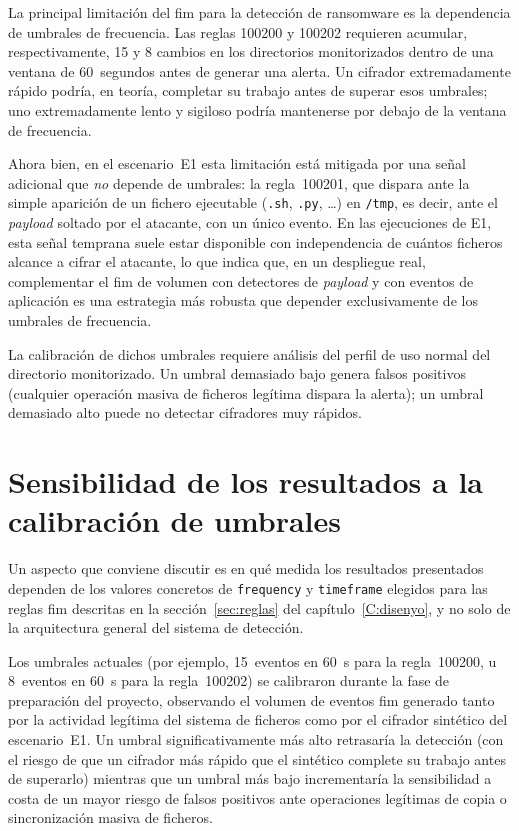 \documentclass[../main.tex]{subfiles}
\begin{document}
La principal limitación del \gls{fim} para la detección de ransomware es la
dependencia de umbrales de frecuencia. Las reglas 100200 y 100202 requieren
acumular, respectivamente, 15 y 8 cambios en los directorios monitorizados dentro
de una ventana de 60~segundos antes de generar una alerta. Un cifrador
extremadamente rápido podría, en teoría, completar su trabajo antes de superar esos
umbrales; uno extremadamente lento y sigiloso podría mantenerse por debajo de la
ventana de frecuencia.

Ahora bien, en el escenario~E1 esta limitación está mitigada por una señal
adicional que \emph{no} depende de umbrales: la regla~100201, que dispara ante la
simple aparición de un fichero ejecutable (\texttt{.sh}, \texttt{.py}, \ldots) en
\texttt{/tmp}, es decir, ante el \emph{payload} soltado por el atacante, con un
único evento. En las ejecuciones de E1, esta señal temprana suele estar disponible
con independencia de cuántos ficheros alcance a cifrar el atacante, lo que indica
que, en un despliegue real, complementar el \gls{fim} de volumen con detectores de
\emph{payload} y con eventos de aplicación es una estrategia más robusta que
depender exclusivamente de los umbrales de frecuencia.

La calibración de dichos umbrales requiere análisis del perfil de uso normal del
directorio monitorizado. Un umbral demasiado bajo genera falsos positivos
(cualquier operación masiva de ficheros legítima dispara la alerta); un umbral
demasiado alto puede no detectar cifradores muy rápidos.

\section{Sensibilidad de los resultados a la calibración de umbrales}
\label{sec:sensibilidad}

Un aspecto que conviene discutir es en qué medida los resultados presentados
dependen de los valores concretos de \texttt{frequency} y \texttt{timeframe}
elegidos para las reglas \gls{fim} descritas en la sección~\ref{sec:reglas} del
capítulo~\ref{C:disenyo}, y no solo de la arquitectura general del sistema de
detección.

Los umbrales actuales (por ejemplo, 15~eventos en 60~s para la regla~100200, u
8~eventos en 60~s para la regla~100202) se calibraron durante la fase de
preparación del proyecto, observando el volumen de eventos \gls{fim} generado tanto
por la actividad legítima del sistema de ficheros como por el cifrador sintético
del escenario~E1. Un umbral significativamente más alto retrasaría la detección (con el riesgo de que un cifrador más rápido que el sintético complete su trabajo
antes de superarlo) mientras que un umbral más bajo incrementaría la sensibilidad
a costa de un mayor riesgo de falsos positivos ante operaciones legítimas de copia
o sincronización masiva de ficheros.
\end{document}
